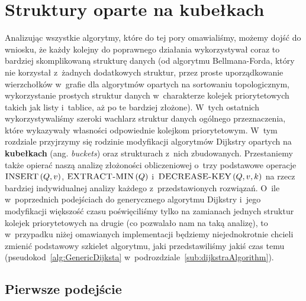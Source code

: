 \newpage
\section{Struktury oparte na kubełkach}
\label{sec:dijkstraBuckets}




Analizując wszystkie algorytmy, które do tej pory omawialiśmy, możemy dojść do wniosku, że każdy kolejny do poprawnego działania wykorzystywał coraz to bardziej skomplikowaną strukturę danych (od algorytmu Bellmana-Forda, który nie korzystał z~żadnych dodatkowych struktur, przez proste uporządkowanie wierzchołków w~grafie dla algorytmów opartych na sortowaniu topologicznym, wykorzystanie prostych struktur danych w~charakterze kolejek priorytetowych takich jak listy i~tablice, aż po te bardziej złożone).
W~tych ostatnich wykorzystywaliśmy szeroki wachlarz struktur danych ogólnego przeznaczenia, które wykazywały własności odpowiednie kolejkom priorytetowym.
W~tym rozdziale przyjrzymy się rodzinie modyfikacji algorytmów Dijkstry opartych na \textbf{kubełkach} (ang. \textit{buckets}) oraz strukturach z~nich zbudowanych.
Przestaniemy także opierać naszą analizę złożoności obliczeniowej o~trzy podstawowe operacje $\textrm{\textsc{INSERT}} \left( Q, v \right)$, $\textrm{\textsc{EXTRACT-MIN}} \left( Q \right)$ i~$\textrm{\textsc{DECREASE-KEY}} \left( Q, v, k \right)$ na rzecz bardziej indywidualnej analizy każdego z~przedstawionych rozwiązań.
O~ile w~poprzednich podejściach do generycznego algorytmu Dijkstry i~jego modyfikacji większość czasu poświęciliśmy tylko na zamianach jednych struktur kolejek priorytetowych na drugie (co pozwalało nam na taką analizę), to w~przypadku niżej omawianych implementacji będziemy niejednokrotnie chcieli zmienić podstawowy szkielet algorytmu, jaki przedstawiliśmy jakiś czas temu (pseudokod~\ref{alg:GenericDijksta} w~podrozdziale~\ref{sub:dijkstraAlgorithm}).



\subsection{Pierwsze podejście}



